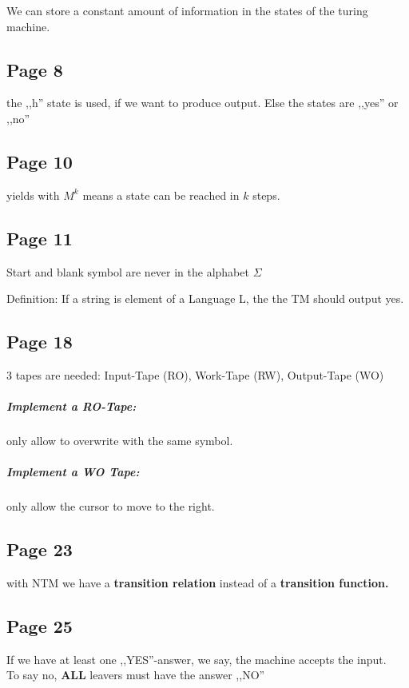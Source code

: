 \documentclass[a4paper]{article}
\begin{document}
We can store a constant amount of information in the states of the turing
machine.


\subsection{Page 8}
the ,,h'' state is used, if we want to produce output. Else the states are
,,yes'' or ,,no''

\subsection{Page 10}

yields with $M^k$ means a state can be reached in $k$ steps.

\subsection{Page 11}
Start and blank symbol are never in the alphabet $\Sigma$

Definition: If a string is element of a Language L, the the TM should output
yes.

\subsection{Page 18}
3 tapes are needed: Input-Tape (RO), Work-Tape (RW), Output-Tape (WO)

\subparagraph{Implement a RO-Tape:} only allow to overwrite with the same
symbol.
\subparagraph{Implement a WO Tape:} only allow the cursor to move to the right.



\subsection{Page 23}

with NTM we have a \textbf{transition relation} instead of a \textbf{transition
function.}

\subsection{Page 25}

If we have at least one ,,YES''-answer, we say, the machine accepts the input.\\
To say no, \textbf{ALL} leavers must have the answer ,,NO''
\end{document}
